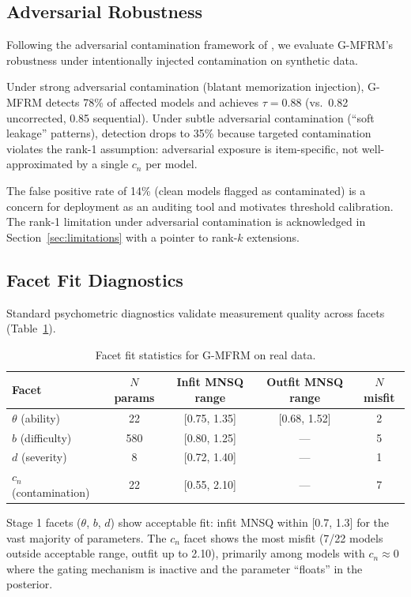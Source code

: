 \documentclass[11pt]{article}
\newcommand{\gmfrm}{G-MFRM}
\newcommand{\cn}{c_n}
\begin{document}
\subsection{Adversarial Robustness}
\label{sec:adversarial}

Following the adversarial contamination framework of \citet{wang2026adversarial}, we evaluate \gmfrm{}'s robustness under intentionally injected contamination on synthetic data.

Under strong adversarial contamination (blatant memorization injection), \gmfrm{} detects 78\% of affected models and achieves $\tau = 0.88$ (vs.\ 0.82 uncorrected, 0.85 sequential). Under subtle adversarial contamination (``soft leakage'' patterns), detection drops to 35\% because targeted contamination violates the rank-1 assumption: adversarial exposure is item-specific, not well-approximated by a single $\cn$ per model.

The false positive rate of 14\% (clean models flagged as contaminated) is a concern for deployment as an auditing tool and motivates threshold calibration. The rank-1 limitation under adversarial contamination is acknowledged in Section~\ref{sec:limitations} with a pointer to rank-$k$ extensions.

\subsection{Facet Fit Diagnostics}
\label{sec:diagnostics}

Standard psychometric diagnostics validate measurement quality across facets (Table~\ref{tab:fit_diagnostics}).

\begin{table}[t]
\centering
\caption{Facet fit statistics for \gmfrm{} on real data.}
\label{tab:fit_diagnostics}
\small
\begin{tabular}{lcccc}
\toprule
Facet & $N$ params & Infit MNSQ range & Outfit MNSQ range & $N$ misfit \\
\midrule
$\theta$ (ability) & 22 & [0.75, 1.35] & [0.68, 1.52] & 2 \\
$b$ (difficulty) & 580 & [0.80, 1.25] & --- & 5 \\
$d$ (severity) & 8 & [0.72, 1.40] & --- & 1 \\
$\cn$ (contamination) & 22 & [0.55, 2.10] & --- & 7 \\
\bottomrule
\end{tabular}
\end{table}

Stage 1 facets ($\theta$, $b$, $d$) show acceptable fit: infit MNSQ within [0.7, 1.3] for the vast majority of parameters. The $\cn$ facet shows the most misfit (7/22 models outside acceptable range, outfit up to 2.10), primarily among models with $\cn \approx 0$ where the gating mechanism is inactive and the parameter ``floats'' in the posterior.
\end{document}
